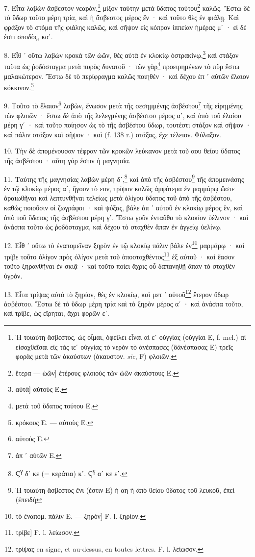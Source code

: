 \documentclass[a4paper, 11pt, oneside, polutonikogreek, french]{article}
\begin{document}
7. Εἶτα λαβὼν ἄσβεστον νεαρὰν,\footnote{Ἡ τοιαύτη ἄσβεστος, ὡς οἶμαι, ὁφείλει εἶναι αἱ εʹ οὐγγίας (οὐγγίαι E, f. mel.) αἱ εἰσαχθεῖσαι εἰς τὰς ιεʹ οὐγγίας τὸ νερὸν τὸ ἀνέσπασες (ὃἀνέσπασας E) τρεῖς φορὰς μετὰ τῶν ἀκαύστων (ἀκαυστον. \emph{sic}, F) φλοιῶν.} μίξον ταύτην μετὰ ὕδατος τούτου\footnote{ἕτερα --- ὠῶν] ἑτέρους φλοιοὺς τῶν ὠῶν ἀκαύστους E.} καλῶς. Ἔστω δὲ τὸ ὕδωρ τοῦτο μέρη τρία, καὶ ἡ ἄσβεστος μέρος ἕν · καὶ τοῦτο θὲς ἐν φιάλῃ. Καὶ φράξον τὸ στόμα τῆς φιάλης καλῶς, καὶ σῆψον εἰς κόπρον ἱππείαν ἡμέρας μʹ · εἰ δέ ἐστι σποδὸς, καʹ.

8. Εἶθ ᾽ οὕτω λαβὼν κροκὰ τῶν ὠῶν, θὲς αὐτὰ ἐν κλοκίῳ ὀστρακίνῳ,\footnote{αὐτὰ] αὐτοὺς E.} καὶ στάξον ταῦτα ὡς ῥοδόσταγμα μετὰ πυρὸς δυνατοῦ · τῶν γὰρ\footnote{μετὰ τοῦ ὕδατος τούτου E.} προειρημένων τὸ πῦρ ἔστω μαλακώτερον. Ἔστω δὲ τὸ περίφραγμα καλῶς ποιηθέν · καὶ δέχου ἐπ ᾽ αὐτῶν ἔλαιον κόκκινον.\footnote{κρόκους E. --- αὐτοὺς E.}

9. Τοῦτο τὸ ἔλαιον\footnote{αὐτοὺς E.} λαβὼν, ἕνωσον μετὰ τῆς σεσημμένης ἀσβέστου\footnote{ἀπ ᾽ αὐτῶν E.} τῆς εἰρημένης τῶν φλοιῶν · ἔστω δὲ ἀπὸ τῆς λελεγμένης ἀσβέστου μέρος αʹ, καὶ ἀπὸ τοῦ ἐλαίου μέρη γʹ · καὶ τοῦτο ποίησον ὡς τὸ τῆς ἀσβέστου ὕδωρ, τουτέστι στάξον καὶ σῆψον · καὶ πάλιν στάξον καὶ σῆψον · καὶ (f. 138 r.) στάξας, ἔχε τέλειον. Φύλαξον.

10. Τὴν δὲ ἀπομένουσαν τέφραν τῶν κροκῶν λεύκανον μετὰ τοῦ αου θείου ὕδατος τῆς ἀσβέστου · αὕτη γάρ ἐστιν ἡ μαγνησία.

11. Ταύτης τῆς μαγνησίας λαβὼν μέρη δʹ,\footnote{Ϛ\textsuperscript{γ} δʹ κε (= κεράτια) κʹ. Ϛ\textsuperscript{γ} αʹ κε εʹ.} καὶ ἀπὸ τῆς ἀσβέστου\footnote{Ἡ τοιαύτη ἄσβεστος ἔνι (ἐστιν Ε) ἡ αη ἡ ἀπὸ θείου ὕδατος τοῦ λευκοῦ, ἐπεὶ (ἐπειδὴ} τῆς ἀπομεινάσης ἐν τῷ κλοκίῳ μέρος αʹ, ἤγουν τὸ εον, τρίψον καλῶς ἀμφότερα ἐν μαρμάρῳ ὥστε ἀραιωθῆναι καὶ λεπτυνθῆναι τελείως μετὰ ὀλίγου ὕδατος τοῦ ἀπὸ τῆς ἀσβέστου, καθὼς ποιοῦσιν οἱ ζωγράφοι · καὶ ψύξας, βάλε ἀπ ᾽ αὐτοῦ ἐν κλοκίῳ μέρος ἓν, καὶ ἀπὸ τοῦ ὕδατος τῆς ἀσβέστου μέρη γʹ. Ἔστω γοῦν ἐνταῦθα τὸ κλοκίον ὑέλινον · καὶ ἀνάσπα τοῦτο ὡς ῥοδόσταγμα, καὶ δέχου τὸ σταχθὲν ἅπαν ἐν ἀγγείῳ ὑελίνῳ.

12. Εἶθ ᾽ οὕτω τὸ ἐναπομεῖναν ξηρὸν ἐν τῷ κλοκίῳ πάλιν βάλε ἐν\footnote{τὸ ἐναπομ. πάλιν E. --- ξηρὸν] F. l. ξηρίον.} μαρμάρῳ · καὶ τρίβε τοῦτο ὀλίγον πρὸς ὀλίγον μετὰ τοῦ ἀποσταχθέντος\footnote{τρίβε] F. l. λείωσον.} ἐξ αὐτοῦ · καὶ ἔασον τοῦτο ξηρανθῆναι ἐν σκιᾷ · καὶ τοῦτο ποίει ἄχρις οὗ δαπανηθῇ ἅπαν τὸ σταχθὲν ὑγρόν.

13. Εἶτα τρίψας αὐτὸ τὸ ξηρίον, θὲς ἐν κλοκίῳ, καὶ μετ ᾽ αὐτοῦ\footnote{τρίψας en signe, et au-dessus, en toutes lettres. F. l. λείωσον.} ἕτερον ὕδωρ ἀσβέστου. Ἔστω δὲ τὸ ὕδωρ μέρη τρία καὶ τὸ ξηρὸν μέρος αʹ · καὶ ἀνάσπα τοῦτο, καὶ τρίβε, ὡς εἴρηται, ἄχρι φορῶν εʹ.
\end{document}
